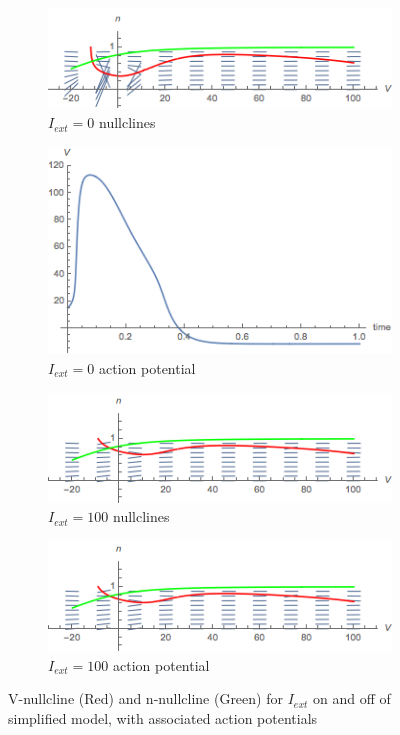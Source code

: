 \documentclass{article}
\begin{document}
\begin{figure}
\centering
\begin{subfigure}{\textwidth}
	\centering
	\includegraphics[width=10cm]{fast_slow_nullclines.png}
	\caption{$I_{ext}=0$ nullclines}
\end{subfigure}
\begin{subfigure}{\textwidth}
	\centering
	\includegraphics[width=10cm]{zero_ext_actionpotential.png}
	\caption{$I_{ext}=0$ action potential}
\end{subfigure}
\begin{subfigure}{\textwidth}
	\centering
	\includegraphics[width=10cm]{fast_slow_nullclines_iext.png}
	\caption{$I_{ext}=100$ nullclines}
\end{subfigure}
\begin{subfigure}{\textwidth}
	\centering
	\includegraphics[width=10cm]{fast_slow_nullclines_iext.png}
	\caption{$I_{ext}=100$ action potential}
\end{subfigure}
	\caption{V-nullcline (Red) and n-nullcline (Green) for $I_{ext}$ on and off of simplified model, with associated action potentials}
	\label{fig:nullc}
\end{figure}
\end{document}
